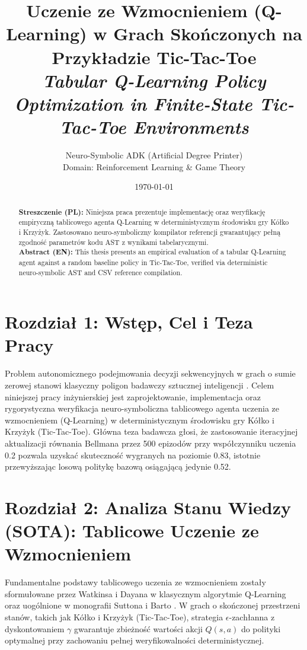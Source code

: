 \documentclass[11pt,a4paper]{article}
\title{\textbf{Uczenie ze Wzmocnieniem (Q-Learning) w Grach Skończonych na Przykładzie Tic-Tac-Toe}\\[0.4em]\large \textit{Tabular Q-Learning Policy Optimization in Finite-State Tic-Tac-Toe Environments}}
\author{Neuro-Symbolic ADK (Artificial Degree Printer) \\ Domain: Reinforcement Learning & Game Theory}
\date{\today}
\begin{document}
\maketitle

\begin{abstract}
\noindent \textbf{Streszczenie (PL):} Niniejsza praca prezentuje implementację oraz weryfikację empiryczną tablicowego agenta Q-Learning w deterministycznym środowisku gry Kółko i Krzyżyk. Zastosowano neuro-symboliczny kompilator referencji gwarantujący pełną zgodność parametrów kodu AST z wynikami tabelarycznymi.\\[0.6em]
\noindent \textbf{Abstract (EN):} This thesis presents an empirical evaluation of a tabular Q-Learning agent against a random baseline policy in Tic-Tac-Toe, verified via deterministic neuro-symbolic AST and CSV reference compilation.
\end{abstract}

\section{Rozdział 1: Wstęp, Cel i Teza Pracy}
Problem autonomicznego podejmowania decyzji sekwencyjnych w grach o sumie zerowej stanowi klasyczny poligon badawczy sztucznej inteligencji \cite{sutton2018reinforcement}. Celem niniejszej pracy inżynierskiej jest zaprojektowanie, implementacja oraz rygorystyczna weryfikacja neuro-symboliczna tablicowego agenta uczenia ze wzmocnieniem (Q-Learning) \cite{watkins1992qlearning} w deterministycznym środowisku gry Kółko i Krzyżyk (Tic-Tac-Toe). Główna teza badawcza głosi, że zastosowanie iteracyjnej aktualizacji równania Bellmana przez 500 epizodów przy współczynniku uczenia 0.2 pozwala uzyskać skuteczność wygranych na poziomie 0.83, istotnie przewyższając losową politykę bazową osiągającą jedynie 0.52.

\section{Rozdział 2: Analiza Stanu Wiedzy (SOTA): Tablicowe Uczenie ze Wzmocnieniem}
Fundamentalne podstawy tablicowego uczenia ze wzmocnieniem zostały sformułowane przez Watkinsa i Dayana w klasycznym algorytmie Q-Learning \cite{watkins1992qlearning} oraz uogólnione w monografii Suttona i Barto \cite{sutton2018reinforcement}. W grach o skończonej przestrzeni stanów, takich jak Kółko i Krzyżyk (Tic-Tac-Toe), strategia $\epsilon$-zachłanna z dyskontowaniem $\gamma$ gwarantuje zbieżność wartości akcji $Q(s, a)$ do polityki optymalnej przy zachowaniu pełnej weryfikowalności deterministycznej.
\end{document}
